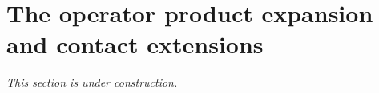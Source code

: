 \section{The operator product expansion and contact extensions}\label{sec:partII-J}

\emph{This section is under construction.}

